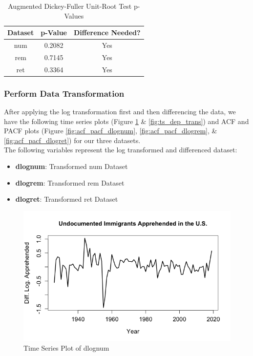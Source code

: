 \documentclass[a4paper]{article}
\begin{document}
\begin{table}[h!]
    \centering
    \caption{Augmented Dickey-Fuller Unit-Root Test p-Values}
    \begin{tabular}{|c|c|c|}
    \hline
    Dataset & p-Value & Difference Needed? \\
    \hline
    num & 0.2082 & Yes \\ 
    \hline
    rem & 0.7145 & Yes \\
    \hline
    ret & 0.3364 & Yes \\ 
    \hline
    \end{tabular}
    \label{tab:dickey1}
\end{table}

\subsubsection{Perform Data Transformation}
After applying the log transformation first and then differencing the data, we have the following time series plots (Figure \ref{fig:ts_app_trans} \& \ref{fig:ts_dep_trans}) and ACF and PACF plots (Figure \ref{fig:acf_pacf_dlognum}, \ref{fig:acf_pacf_dlogrem}, \& \ref{fig:acf_pacf_dlogret}) for our three datasets. \\

The following variables represent the log transformed and differenced dataset:

\begin{itemize}
    \item \textbf{dlognum}: Transformed num Dataset
    \item \textbf{dlogrem}: Transformed rem Dataset
    \item \textbf{dlogret}: Transformed ret Dataset
\end{itemize}

\begin{figure}[h!]
\centering
\includegraphics[scale=0.4]{images/ts_app_trans.png}
\caption{Time Series Plot of dlognum}
\label{fig:ts_app_trans}
\end{figure}
\end{document}
